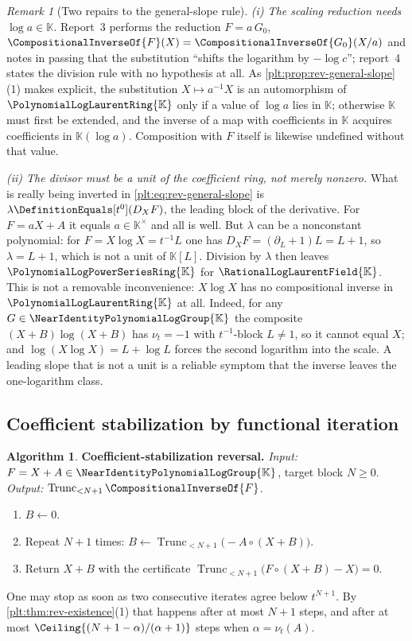 \documentclass[11pt,oneside]{article}
\theoremstyle{plain}
\theoremstyle{definition}
\newtheorem{algorithm}[theorem]{Algorithm}
\theoremstyle{remark}
\newtheorem{remark}[theorem]{Remark}
\newcommand{\K}{\mathbb{K}}
\newcommand{\PLpow}{\PolynomialLogPowerSeriesRing{\K}}   %
\newcommand{\PLlau}{\PolynomialLogLaurentRing{\K}}       %
\newcommand{\PLrat}{\RationalLogLaurentField{\K}}        %
\newcommand{\Gnear}{\NearIdentityPolynomialLogGroup{\K}} %
\newcommand{\ordt}{\nu_{t}}                              %
\newcommand{\Trunc}[2]{\operatorname{Trunc}_{<#2}#1}     %
\newcommand{\DX}{D_{X}}                                  %
\newcommand{\compose}{\mathbin{\circ}}
\newcommand{\rev}[1]{\CompositionalInverseOf{#1}}
\begin{document}
\begin{remark}[Two repairs to the general-slope rule]
\label{plt:rmk:rev-slope-repairs}
\emph{(i) The scaling reduction needs \(\log a\in\K\).}  Report~3 performs the
reduction \(F=a\,G_0\), \(\rev{F}(X)=\rev{G_0}(X/a)\) and notes in passing that
the substitution ``shifts the logarithm by \(-\log c\)''; report~4 states the
division rule with no hypothesis at all.  As
\cref{plt:prop:rev-general-slope}(1) makes explicit, the substitution
\(X\mapsto a^{-1}X\) is an automorphism of \(\PLlau\) only if a value of
\(\log a\) lies in \(\K\); otherwise \(\K\) must first be extended, and the
inverse of a map with coefficients in \(\K\) acquires coefficients in
\(\K(\log a)\).  Composition with \(F\) itself is likewise undefined without
that value.

\emph{(ii) The divisor must be a unit of the coefficient ring, not merely
nonzero.}  What is really being inverted in
\eqref{plt:eq:rev-general-slope} is \(\lambda\DefinitionEquals[t^0](\DX F)\),
the leading block of the derivative.  For \(F=aX+A\) it equals \(a\in\K^\times\)
and all is well.  But \(\lambda\) can be a nonconstant polynomial: for
\(F=X\log X=t^{-1}L\) one has
\(\DX F=(\partial_L+1)L=L+1\), so \(\lambda=L+1\), which is not a unit of
\(\K[L]\).  Division by \(\lambda\) then leaves \(\PLpow\) for \(\PLrat\).  This
is not a removable inconvenience: \(X\log X\) has no compositional inverse in
\(\PLlau\) at all.  Indeed, for any \(G\in\Gnear\) the composite
\((X+B)\log(X+B)\) has \(\ordt=-1\) with \(t^{-1}\)-block \(L\ne1\), so it
cannot equal \(X\); and \(\log(X\log X)=L+\log L\) forces the second logarithm
into the scale.  A leading slope that is not a unit is a reliable symptom that
the inverse leaves the one-logarithm class.
\end{remark}

\subsection{Coefficient stabilization by functional iteration}
\label{plt:sec:rev-picard}

\begin{algorithm}
\label{plt:alg:rev-picard}
\textbf{Coefficient-stabilization reversal.}
\emph{Input:} \(F=X+A\in\Gnear\), target block \(N\ge0\).
\emph{Output:} \(\Trunc{\rev{F}}{N+1}\).
\begin{enumerate}
\item \(B\leftarrow0\).
\item Repeat \(N+1\) times:
 \(B\leftarrow\Trunc{\bigl(-A\compose(X+B)\bigr)}{N+1}\).
\item Return \(X+B\) with the certificate
 \(\Trunc{\bigl(F\compose(X+B)-X\bigr)}{N+1}=0\).
\end{enumerate}
One may stop as soon as two consecutive iterates agree below \(t^{N+1}\).  By
\cref{plt:thm:rev-existence}(1) that happens after at most \(N+1\) steps, and
after at most \(\Ceiling{(N+1-\alpha)/(\alpha+1)}\) steps when
\(\alpha=\ordt(A)\).
\end{algorithm}
\end{document}

